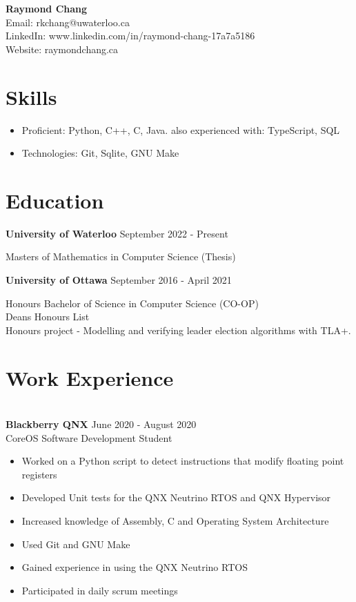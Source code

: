 \documentclass{article}
\begin{document}
\begin{center}
    {\huge\textbf{Raymond Chang}} \\
    Email: rkchang@uwaterloo.ca \\
    LinkedIn: www.linkedin.com/in/raymond-chang-17a7a5186 \\
    Website: raymondchang.ca
\end{center}

\section{Skills} \hrulefill
\begin{itemize}[noitemsep]
    \item Proficient: Python, C++, C, Java. also experienced with: TypeScript, SQL
    \item Technologies: Git, Sqlite, GNU Make
\end{itemize}

\smallskip

\section{Education} \hrulefill

\textbf{University of Waterloo} \hfill September 2022 - Present

Masters of Mathematics in Computer Science (Thesis)

\hfill

\textbf{University of Ottawa} \hfill September 2016 - April 2021

Honours Bachelor of Science in Computer Science (CO-OP) \\ Deans Honours List \\ Honours project - Modelling and verifying leader election algorithms with TLA+.
\smallskip

\section{Work Experience}

\hrulefill \\
\textbf{Blackberry QNX} \hfill June 2020 - August 2020 \\
CoreOS Software Development Student
\begin{itemize}[noitemsep]
    \item Worked on a Python script to detect instructions that modify floating point registers
    \item Developed Unit tests for the QNX Neutrino RTOS and QNX Hypervisor
    \item Increased knowledge of Assembly, C and Operating System Architecture
    \item Used Git and GNU Make
    \item Gained experience in using the QNX Neutrino RTOS
    \item Participated in daily scrum meetings
\end{itemize}
\end{document}
